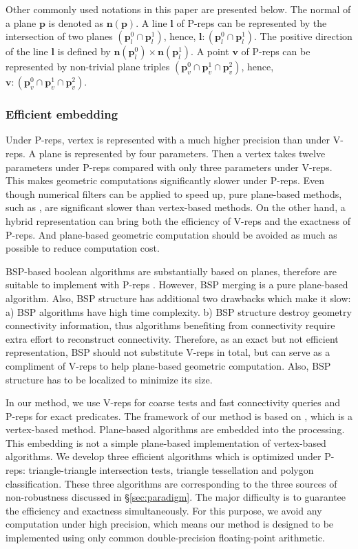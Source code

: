 Other commonly used notations in this paper are presented below. The normal of a plane $\bm{p}$ is denoted as $\bm{n}(\bm{p})$. A line $\bm{l}$ of P-reps can be represented by the intersection of two planes $(\bm{p}_l^0 \cap \bm{p}_l^1)$, hence, $\bm{l}\colon(\bm{p}_l^0 \cap \bm{p}_l^1)$. The positive direction of the line $\bm{l}$ is defined by $\bm{n}(\bm{p}_l^0) \times \bm{n}(\bm{p}_l^1)$.
A point $\bm{v}$ of P-reps can be represented by non-trivial plane triples $(\bm{p}_v^0 \cap \bm{p}_v^1 \cap \bm{p}_v^2)$, hence, $\bm{v}\colon(\bm{p}_v^0 \cap \bm{p}_v^1 \cap \bm{p}_v^2)$.

\subsubsection{Efficient embedding}

Under P-reps, vertex is represented with a much higher precision than under V-reps. A plane is represented by four parameters. Then a vertex takes twelve parameters under P-reps compared with only three parameters under V-reps. This makes geometric computations significantly slower under P-reps. Even though numerical filters can be applied to speed up, pure plane-based methods, such as \cite{sugihara1990solid,banerjee1996topologically}, are significant slower than vertex-based methods. On the other hand, a hybrid representation can bring both the efficiency of V-reps and the exactness of P-reps. And plane-based geometric computation should be avoided as much as possible to reduce computation cost.

BSP-based boolean algorithms are substantially based on planes, therefore are suitable to implement with P-reps \cite{bernstein2009fast,campen2010exact}. However, BSP merging is a pure plane-based algorithm. Also, BSP structure has additional two drawbacks which make it slow: a) BSP algorithms have high time complexity. b) BSP structure destroy geometry connectivity information, thus algorithms benefiting from connectivity require extra effort to reconstruct connectivity. Therefore, as an exact but not efficient representation, BSP should not substitute V-reps in total, but can serve as a compliment of V-reps to help plane-based geometric computation. Also, BSP structure has to be localized to minimize its size.

In our method, we use V-reps for coarse tests and fast connectivity queries and P-reps for exact predicates. The framework of our method is based on \cite{ogayar2015deferred}, which is a vertex-based method. Plane-based algorithms are embedded into the processing. This embedding is not a simple plane-based implementation of vertex-based algorithms. We develop three efficient algorithms which is optimized under P-reps: triangle-triangle intersection tests, triangle tessellation and polygon classification. These three algorithms are corresponding to the three sources of non-robustness discussed in \S\ref{sec:paradigm}. The major difficulty is to guarantee the efficiency and exactness simultaneously. For this purpose, we avoid any computation under high precision, which means our method is designed to be implemented using only common double-precision floating-point arithmetic.

